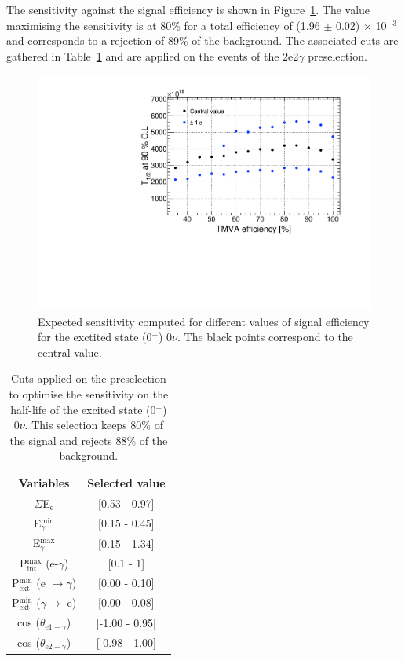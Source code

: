 \documentclass[main.tex]{subfiles}
\begin{document}
\bigskip


\NI The sensitivity against the signal efficiency is shown in Figure~\ref{plot:SensVsEffbb0nu0_250}. The value maximising the sensitivity is at 80\% for a total efficiency of (1.96 $\pm$ 0.02) $\times$ 10$^{-\text{3}}$ and corresponds to a rejection of 89\% of the background. The associated cuts are gathered in Table~\ref{tab:Cuts0nu0Plus250keV} and are applied on the events of the 2e2$\gamma$ preselection.


\begin{figure} [h!]
\begin{center}
\includegraphics[scale=0.55]{pictures/FinalResults/bb0nu0/SensVsEff_bb0nu0_250_v2.pdf}
\end{center}
\caption{Expected sensitivity computed for different values of signal efficiency for the exctited state (0$^+$) 0$\nu$. The black points correspond to the central value.}
\label{plot:SensVsEffbb0nu0_250}
\end{figure}



\begin{table}[h!]
\centering
\begin{tabular}{c|c}
Variables & Selected value \\
\toprule
$\Sigma$E$_{\text{e}}$ & [0.53 - 0.97] \\
E$_{\gamma}^{\text{min}}$    & [0.15 - 0.45] \\
E$_{\gamma}^{\text{max}}$    & [0.15 - 1.34] \\
P$_{\text{int}}^{\text{max}}$ (e-$\gamma$) & [0.1 - 1] \\
P$_{\text{ext}}^{\text{min}}$ (e $\rightarrow \gamma$) & [0.00 - 0.10] \\
P$_{\text{ext}}^{\text{min}}$ ($\gamma \rightarrow$ e) & [0.00 - 0.08] \\
cos ($\theta_{\text{e1}-\gamma}$) & [-1.00 - 0.95] \\
cos ($\theta_{\text{e2}-\gamma}$) & [-0.98 - 1.00] \\
\bottomrule
\end{tabular}
\caption{Cuts applied on the preselection to optimise the sensitivity on the half-life of the excited state (0$^+$) 0$\nu$. This selection keeps 80\% of the signal and rejects 88\% of the background.}
\label{tab:Cuts0nu0Plus250keV}
\end{table}
\end{document}
